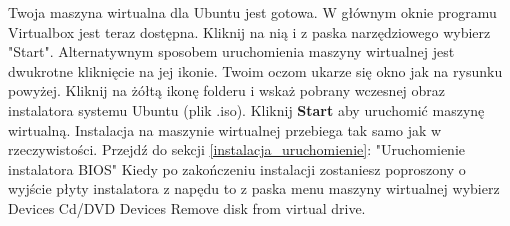 Twoja maszyna wirtualna dla Ubuntu jest gotowa. W głównym oknie programu Virtualbox jest teraz dostępna. Kliknij na nią i z paska narzędziowego wybierz "Start". Alternatywnym sposobem uruchomienia maszyny wirtualnej jest dwukrotne kliknięcie na jej ikonie.
Twoim oczom ukarze się okno jak na rysunku powyżej. Kliknij na żółtą ikonę folderu i wskaż pobrany wczesnej obraz instalatora systemu Ubuntu (plik .iso). Kliknij \textbf{Start} aby uruchomić maszynę wirtualną.
Instalacja na maszynie wirtualnej przebiega tak samo jak w rzeczywistości. Przejdź do sekcji \ref{instalacja_uruchomienie}: "Uruchomienie instalatora BIOS"
Kiedy po zakończeniu instalacji zostaniesz poproszony o wyjście płyty instalatora z napędu to z paska menu maszyny wirtualnej wybierz Devices Cd/DVD Devices Remove disk from virtual drive.
\clearpage
